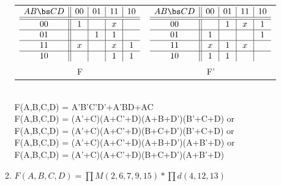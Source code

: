 \begin{enumerate}
\begin{enumerate}
\begin{onlysolution}
{                        \begin{tabular}{cc}
                            $
                            \begin{array} {c||c|c|c|c}
                                A B \bs C D   & 00 & 01 & 11 & 10 \\ \hline \hline
                                00        & 1  &    & x  &    \\ \hline
                                01        &    & 1  & 1  &    \\ \hline
                                11        & x  &    & x  & 1  \\ \hline
                                10        &    &    & 1  & 1  \\
                            \end{array}$ &
                            $
                            \begin{array} {c||c|c|c|c}
                                A B \bs C D   & 00 & 01 & 11 & 10 \\ \hline \hline
                                00        &    & 1  & x  & 1  \\ \hline
                                01        & 1  &    &    & 1  \\ \hline
                                11        & x  & 1  & x  &    \\ \hline
                                10        & 1  & 1  &    &    \\
                            \end{array}$ \\
                            F  & F' \\
                        \end{tabular} \\
                        \SOPmin F(A,B,C,D) =  A'B'C'D'+A'BD+AC\\
                        \POSmin F(A,B,C,D) =  (A'+C)(A+C'+D)(A+B+D')(B'+C+D) or \\
                        \POSmin F(A,B,C,D) =  (A'+C)(A+C'+D)(B+C+D')(B'+C+D) or \\
                        \POSmin F(A,B,C,D) =  (A'+C)(A+C'+D)(A+B+D')(A+B'+D) or \\
                        \POSmin F(A,B,C,D) =  (A'+C)(A+C'+D)(B+C+D')(A+B'+D)  \\
                    }
                \end{onlysolution}
            \item  $F(A,B,C,D) = \prod M(2,6,7,9,15) * \prod d(4,12,13) $


\end{enumerate}
\end{enumerate}
